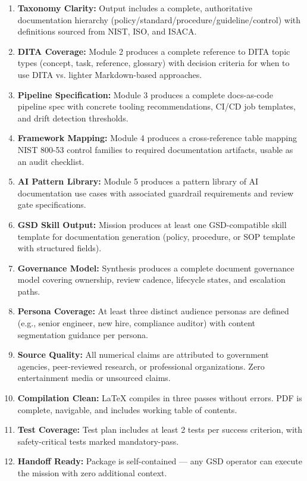 \documentclass[11pt,letterpaper]{article}
\begin{document}
\begin{enumerate}[leftmargin=*, label=\textbf{SC\arabic*.}]
  \item \textbf{Taxonomy Clarity:} Output includes a complete, authoritative documentation hierarchy (policy/standard/procedure/guideline/control) with definitions sourced from NIST, ISO, and ISACA.
  \item \textbf{DITA Coverage:} Module 2 produces a complete reference to DITA topic types (concept, task, reference, glossary) with decision criteria for when to use DITA vs. lighter Markdown-based approaches.
  \item \textbf{Pipeline Specification:} Module 3 produces a complete docs-as-code pipeline spec with concrete tooling recommendations, CI/CD job templates, and drift detection thresholds.
  \item \textbf{Framework Mapping:} Module 4 produces a cross-reference table mapping NIST 800-53 control families to required documentation artifacts, usable as an audit checklist.
  \item \textbf{AI Pattern Library:} Module 5 produces a pattern library of AI documentation use cases with associated guardrail requirements and review gate specifications.
  \item \textbf{GSD Skill Output:} Mission produces at least one GSD-compatible skill template for documentation generation (policy, procedure, or SOP template with structured fields).
  \item \textbf{Governance Model:} Synthesis produces a complete document governance model covering ownership, review cadence, lifecycle states, and escalation paths.
  \item \textbf{Persona Coverage:} At least three distinct audience personas are defined (e.g., senior engineer, new hire, compliance auditor) with content segmentation guidance per persona.
  \item \textbf{Source Quality:} All numerical claims are attributed to government agencies, peer-reviewed research, or professional organizations. Zero entertainment media or unsourced claims.
  \item \textbf{Compilation Clean:} LaTeX compiles in three passes without errors. PDF is complete, navigable, and includes working table of contents.
  \item \textbf{Test Coverage:} Test plan includes at least 2 tests per success criterion, with safety-critical tests marked mandatory-pass.
  \item \textbf{Handoff Ready:} Package is self-contained --- any GSD operator can execute the mission with zero additional context.
\end{enumerate}
\end{document}
